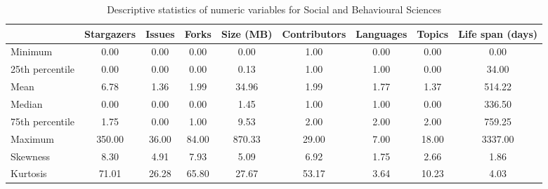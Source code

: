 
\begin{table}[h!]
\centering
\begin{adjustbox}{center}
\begin{tabular}{lcccccccc}
\toprule
{} &  Stargazers &  Issues &  Forks &  Size (MB) &  Contributors &  Languages &  Topics &  Life span (days) \\
\midrule
Minimum         &        0.00 &    0.00 &   0.00 &    0.00 &          1.00 &       0.00 &    0.00 &       0.00 \\
25th percentile &        0.00 &    0.00 &   0.00 &    0.13 &          1.00 &       1.00 &    0.00 &      34.00 \\
Mean            &        6.78 &    1.36 &   1.99 &   34.96 &          1.99 &       1.77 &    1.37 &     514.22 \\
Median          &        0.00 &    0.00 &   0.00 &    1.45 &          1.00 &       1.00 &    0.00 &     336.50 \\
75th percentile &        1.75 &    0.00 &   1.00 &    9.53 &          2.00 &       2.00 &    2.00 &     759.25 \\
Maximum         &      350.00 &   36.00 &  84.00 &  870.33 &         29.00 &       7.00 &   18.00 &    3337.00 \\
Skewness        &        8.30 &    4.91 &   7.93 &    5.09 &          6.92 &       1.75 &    2.66 &       1.86 \\
Kurtosis        &       71.01 &   26.28 &  65.80 &   27.67 &         53.17 &       3.64 &   10.23 &       4.03 \\
\bottomrule
\end{tabular}
\end{adjustbox}
\caption{Descriptive statistics of numeric variables for Social and Behavioural Sciences}
\end{table}
